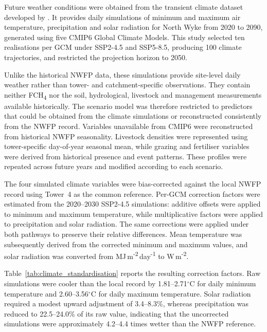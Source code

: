 Future weather conditions were obtained from the transient climate dataset developed by \cite{semenov2025transient}. It provides daily simulations of minimum and maximum air temperature, precipitation
and solar radiation for North Wyke from 2020 to 2090, generated using five CMIP6 Global Climate Models. This study selected ten realisations per GCM under SSP2-4.5 and SSP5-8.5, producing 100 climate
trajectories, and restricted the projection horizon to 2050.

Unlike the historical NWFP data, these simulations provide site-level daily weather rather than tower- and catchment-specific observations. They contain neither FCH\textsubscript{4} nor the soil,
hydrological, livestock and management measurements available historically. The scenario model was therefore restricted to predictors that could be obtained from the climate simulations or reconstructed
consistently from the NWFP record. Variables unavailable from CMIP6 were reconstructed from historical NWFP
  seasonality. Livestock densities were represented using tower-specific
  day-of-year seasonal mean, while grazing and fertiliser variables were derived
  from historical presence and event patterns. These profiles were repeated
  across future years and modified according to each scenario.

The four simulated climate variables were bias-corrected against the local NWFP record using Tower~4 as the common reference. Per-GCM correction factors were estimated from the 2020--2030 SSP2-4.5
simulations: additive offsets were applied to minimum and maximum temperature, while multiplicative factors were applied to precipitation and solar radiation. The same corrections were applied under both
pathways to preserve their relative differences. Mean temperature was subsequently derived from the corrected minimum and maximum values, and solar radiation was converted from
MJ\,m\textsuperscript{-2}\,day\textsuperscript{-1} to W\,m\textsuperscript{-2}.

Table~\ref{tab:climate_standardisation} reports the resulting correction factors. Raw simulations were cooler than the local record by 1.81--2.71$^\circ$C for daily minimum temperature and
2.60--3.56$^\circ$C for daily maximum temperature. Solar radiation required a modest upward adjustment of 3.4--8.3\%, whereas precipitation was reduced to 22.5--24.0\% of its raw value, indicating that
the uncorrected simulations were approximately 4.2--4.4 times wetter than the NWFP reference.

